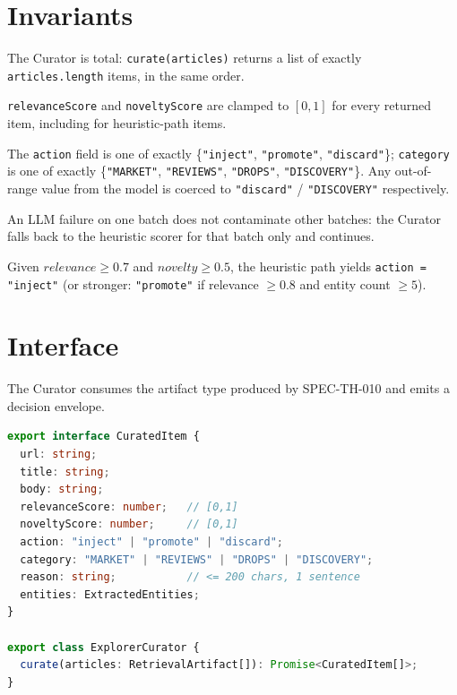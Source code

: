 \section{Invariants}
\begin{invariant}
The Curator is total: \texttt{curate(articles)} returns a list of exactly \texttt{articles.length} items, in the same order.
\end{invariant}

\begin{invariant}
\texttt{relevanceScore} and \texttt{noveltyScore} are clamped to \([0,1]\) for every returned item,
including for heuristic-path items.
\end{invariant}

\begin{invariant}
The \texttt{action} field is one of exactly \{\texttt{"inject"}, \texttt{"promote"}, \texttt{"discard"}\};
\texttt{category} is one of exactly \{\texttt{"MARKET"}, \texttt{"REVIEWS"}, \texttt{"DROPS"}, \texttt{"DISCOVERY"}\}.
Any out-of-range value from the model is coerced to \texttt{"discard"} / \texttt{"DISCOVERY"} respectively.
\end{invariant}

\begin{invariant}
An LLM failure on one batch does not contaminate other batches: the Curator falls back to the
heuristic scorer for that batch only and continues.
\end{invariant}

\begin{invariant}
Given \(relevance \ge 0.7\) and \(novelty \ge 0.5\), the heuristic path yields \texttt{action = "inject"}
(or stronger: \texttt{"promote"} if relevance \(\ge 0.8\) and entity count \(\ge 5\)).
\end{invariant}

\section{Interface}
The Curator consumes the artifact type produced by SPEC-TH-010 and emits a decision envelope.

\begin{lstlisting}[language=TypeScript]
export interface CuratedItem {
  url: string;
  title: string;
  body: string;
  relevanceScore: number;   // [0,1]
  noveltyScore: number;     // [0,1]
  action: "inject" | "promote" | "discard";
  category: "MARKET" | "REVIEWS" | "DROPS" | "DISCOVERY";
  reason: string;           // <= 200 chars, 1 sentence
  entities: ExtractedEntities;
}

export class ExplorerCurator {
  curate(articles: RetrievalArtifact[]): Promise<CuratedItem[]>;
}
\end{lstlisting}

